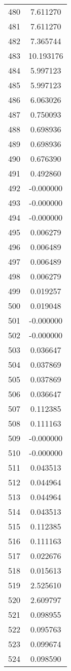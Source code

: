 \documentclass[12pt]{article}
\begin{document}
\begin{longtable}{@{}cc@{}}
480 & 7.611270 \\
481 & 7.611270 \\
482 & 7.365744 \\
483 & 10.193176 \\
484 & 5.997123 \\
485 & 5.997123 \\
486 & 6.063026 \\
487 & 0.750093 \\
488 & 0.698936 \\
489 & 0.698936 \\
490 & 0.676390 \\
491 & 0.492860 \\
492 & -0.000000 \\
493 & -0.000000 \\
494 & -0.000000 \\
495 & 0.006279 \\
496 & 0.006489 \\
497 & 0.006489 \\
498 & 0.006279 \\
499 & 0.019257 \\
500 & 0.019048 \\
501 & -0.000000 \\
502 & -0.000000 \\
503 & 0.036647 \\
504 & 0.037869 \\
505 & 0.037869 \\
506 & 0.036647 \\
507 & 0.112385 \\
508 & 0.111163 \\
509 & -0.000000 \\
510 & -0.000000 \\
511 & 0.043513 \\
512 & 0.044964 \\
513 & 0.044964 \\
514 & 0.043513 \\
515 & 0.112385 \\
516 & 0.111163 \\
517 & 0.022676 \\
518 & 0.015613 \\
519 & 2.525610 \\
520 & 2.609797 \\
521 & 0.098955 \\
522 & 0.095763 \\
523 & 0.099674 \\
524 & 0.098590 \\

\end{longtable}
\end{document}
